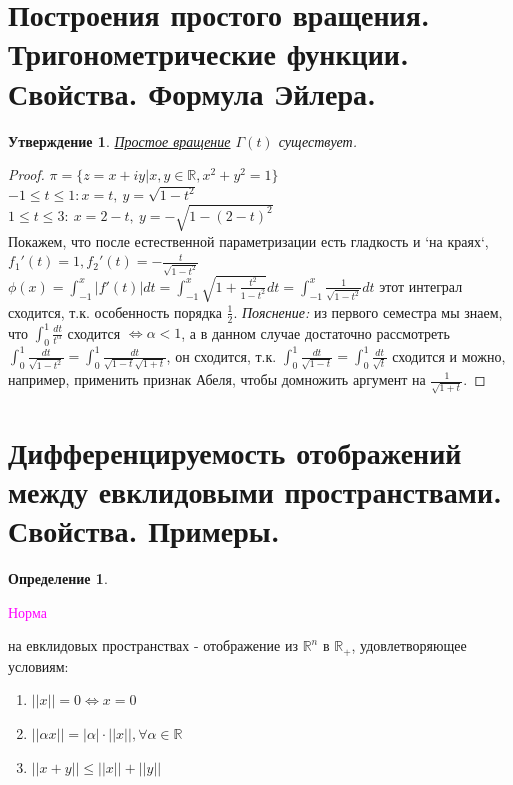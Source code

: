 \documentclass{article}
\makeatletter
\theoremstyle{indented}
\newtheorem{stat}{Утверждение}
\theoremstyle{definition}
\newtheorem{defn}{Определение}
\theoremstyle{remark}
\newcommand{\hlink}[2]{\hyperlink{#1}{#2}}
\newcommand{\add}[2]
{
    \hypertarget{#1}{\textcolor{magenta}{#2}}
    \index{#2@\protect\hyperlink{#1}{#2}}
}
\makeatother
\begin{document}
\section{Построения простого вращения. Тригонометрические функции. Свойства. Формула Эйлера.}


\begin{stat}
    \hlink{rotation}{Простое вращение} $\Gamma(t)$ существует.
\end{stat}
\begin{proof}
    $\pi=\{  z=x+iy \big| x,y\in \mathbb{R}, x^2+y^2=1 \}$\\
    $-1 \leq t \leq 1: x = t, \ y = \sqrt{1-t^2}$\\
    $1 \leq t \leq 3: \ x = 2-t, \ y = -\sqrt{1-(2-t)^2}$\\
    Покажем, что после естественной параметризации есть гладкость и `на краях`,
    $f_1'(t)=1, f_2'(t)=-\frac{t}{\sqrt{1-t^2}}$\\
    $\phi (x) = \int_{-1}^x |f'(t)| dt = \int_{-1}^x \sqrt{1+\frac{t^2}{1-t^2}} dt = \int_{-1}^{x} 
    \frac{1}{\sqrt{1-t^2}} dt$ этот интеграл сходится, т.к. особенность порядка $\frac{1}{2}$.
    \textit{Пояснение:} из первого семестра мы знаем, что 
    $\int_{0}^{1} \frac{dt}{t^\alpha} $ сходится $\Leftrightarrow  \alpha < 1$, а в данном случае 
    достаточно рассмотреть $\int_0^1 \frac{dt}{\sqrt{1-t^2}} = \int_0^1 \frac{dt}{\sqrt{1-t}\sqrt{1+t}} $,
    он сходится, т.к. $\int_0^1 \frac{dt}{\sqrt{1-t}} = \int_0^1 \frac{dt}{\sqrt{t}}$ сходится и можно, например,
    применить признак Абеля, чтобы домножить аргумент на $\frac{1}{\sqrt{1+t}}$.
\end{proof}

\section{Дифференцируемость отображений между евклидовыми пространствами. Свойства. Примеры.}


\begin{defn}
    \add{norma}{Норма} на евклидовых пространствах - отображение из $\mathbb{R}^n$ в $\mathbb{R}_+$, удовлетворяющее условиям:
    \begin{enumerate}
        \item $||x||=0 \Leftrightarrow x=0$
        \item $||\alpha x|| = |\alpha| \cdot ||x||, \forall \alpha \in \mathbb{R}$
        \item $||x+y|| \leq ||x|| + ||y||$
    \end{enumerate} 
\end{defn}
\end{document}
